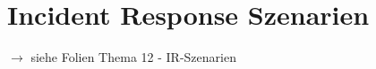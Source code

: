 \section{Incident Response Szenarien}
$\rightarrow$ siehe Folien \glqq Thema 12 - IR-Szenarien\grqq
